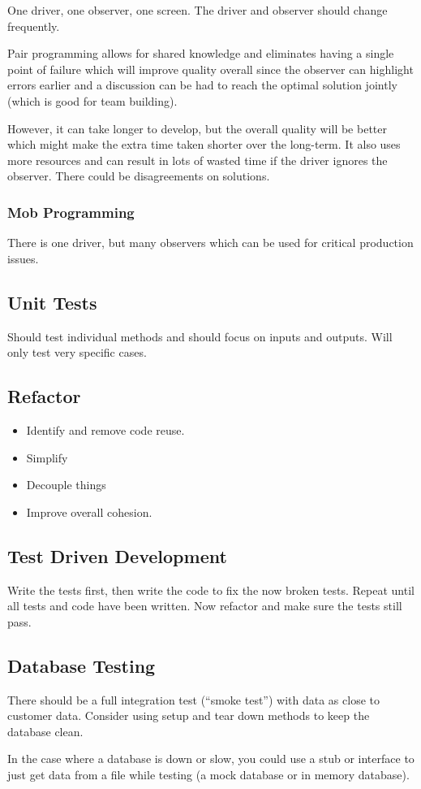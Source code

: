 One driver, one observer, one screen.
The driver and observer should change frequently.

Pair programming allows for shared knowledge and eliminates having a single point of failure which will improve quality overall since the observer can highlight errors earlier and a discussion can be had to reach the optimal solution jointly (which is good for team building).

However, it can take longer to develop, but the overall quality will be better which might make the extra time taken shorter over the long-term.
It also uses more resources and can result in lots of wasted time if the driver ignores the observer.
There could be disagreements on solutions.

\subsubsection{Mob Programming}\label{ssub:mob_programming}

There is one driver, but many observers which can be used for critical production issues.

\subsection{Unit Tests}\label{sub:unit_tests}

Should test individual methods and should focus on inputs and outputs.
Will only test very specific cases.

\subsection{Refactor}\label{sub:refactor}

\begin{itemize}
	\item Identify and remove code reuse.
	\item Simplify
	\item Decouple things
	\item Improve overall cohesion.
\end{itemize}

\subsection{Test Driven Development}\label{sub:test_driven_development}

Write the tests first, then write the code to fix the now broken tests.
Repeat until all tests and code have been written.
Now refactor and make sure the tests still pass.

\subsection{Database Testing}\label{sub:database_testing}

There should be a full integration test (``smoke test'') with data as close to customer data.
Consider using setup and tear down methods to keep the database clean.

In the case where a database is down or slow, you could use a stub or interface to just get data from a file while testing (a mock database or in memory database).
